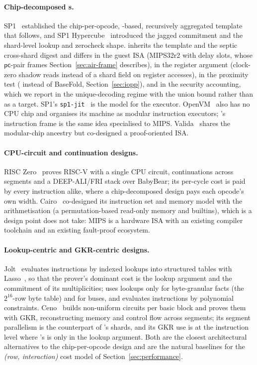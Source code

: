 \paragraph{Chip-decomposed \zkVM{}s.} SP1~\citep{sp1} established the chip-per-opcode, \LogUp{}-based, recursively aggregated template that \Ziren{} follows, and SP1 Hypercube~\citep{sp1-hypercube} introduced the jagged commitment and the shard-level lookup and zerocheck shape. \Zirenver{} inherits the template and the septic cross-shard digest and differs in the guest ISA (MIPS32r2 with delay slots, whose $\mathsf{pc}$-pair frames Section~\ref{sec:air-frame} describes), in the register argument (clock-zero shadow reads instead of a shard field on register accesses), in the proximity test (\WHIR{} instead of BaseFold, Section~\ref{sec:iopp}), and in the security accounting, which we report in the unique-decoding regime with the union bound rather than as a target. SP1's \texttt{sp1-jit}~\citep{sp1-jit} is the model for the executor. OpenVM~\citep{openvm} also has no CPU chip and organises its machine as modular instruction executors; \Ziren{}'s instruction frame is the same idea specialised to MIPS. Valida~\citep{valida} shares the modular-chip ancestry but co-designed a proof-oriented ISA.

\paragraph{CPU-circuit and continuation designs.} RISC Zero~\citep{risc0} proves RISC-V with a single CPU circuit, continuations across segments and a DEEP-ALI/FRI stack over BabyBear; its per-cycle cost is paid by every instruction alike, where a chip-decomposed design pays each opcode's own width. Cairo~\citep{cairo} co-designed its instruction set and memory model with the arithmetisation (a permutation-based read-only memory and builtins), which is a design point \Ziren{} does not take: MIPS is a hardware ISA with an existing compiler toolchain and an existing fault-proof ecosystem.

\paragraph{Lookup-centric and GKR-centric designs.} Jolt~\citep{jolt} evaluates instructions by indexed lookups into structured tables with Lasso~\citep{lasso}, so that the prover's dominant cost is the lookup argument and the commitment of its multiplicities; \Ziren{} uses lookups only for byte-granular facts (the $2^{16}$-row byte table) and for buses, and evaluates instructions by polynomial constraints. Ceno~\citep{ceno} builds non-uniform circuits per basic block and proves them with GKR, reconstructing memory and control flow across segments; its segment parallelism is the counterpart of \Ziren{}'s shards, and its GKR use is at the instruction level where \Ziren{}'s is only in the lookup argument. Both are the closest architectural alternatives to the chip-per-opcode design and are the natural baselines for the \emph{(row, interaction)} cost model of Section~\ref{sec:performance}.

